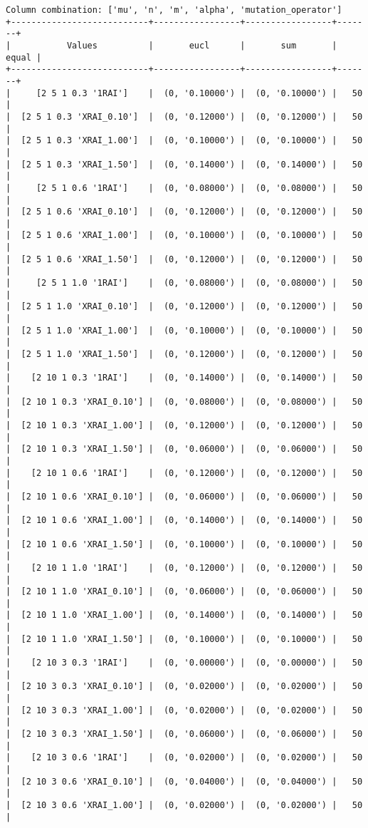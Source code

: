 \documentclass{article}
\begin{document}
\begin{verbatim}
Column combination: ['mu', 'n', 'm', 'alpha', 'mutation_operator']
+---------------------------+-----------------+-----------------+-------+
|           Values          |       eucl      |       sum       | equal |
+---------------------------+-----------------+-----------------+-------+
|     [2 5 1 0.3 '1RAI']    |  (0, '0.10000') |  (0, '0.10000') |   50  |
|  [2 5 1 0.3 'XRAI_0.10']  |  (0, '0.12000') |  (0, '0.12000') |   50  |
|  [2 5 1 0.3 'XRAI_1.00']  |  (0, '0.10000') |  (0, '0.10000') |   50  |
|  [2 5 1 0.3 'XRAI_1.50']  |  (0, '0.14000') |  (0, '0.14000') |   50  |
|     [2 5 1 0.6 '1RAI']    |  (0, '0.08000') |  (0, '0.08000') |   50  |
|  [2 5 1 0.6 'XRAI_0.10']  |  (0, '0.12000') |  (0, '0.12000') |   50  |
|  [2 5 1 0.6 'XRAI_1.00']  |  (0, '0.10000') |  (0, '0.10000') |   50  |
|  [2 5 1 0.6 'XRAI_1.50']  |  (0, '0.12000') |  (0, '0.12000') |   50  |
|     [2 5 1 1.0 '1RAI']    |  (0, '0.08000') |  (0, '0.08000') |   50  |
|  [2 5 1 1.0 'XRAI_0.10']  |  (0, '0.12000') |  (0, '0.12000') |   50  |
|  [2 5 1 1.0 'XRAI_1.00']  |  (0, '0.10000') |  (0, '0.10000') |   50  |
|  [2 5 1 1.0 'XRAI_1.50']  |  (0, '0.12000') |  (0, '0.12000') |   50  |
|    [2 10 1 0.3 '1RAI']    |  (0, '0.14000') |  (0, '0.14000') |   50  |
|  [2 10 1 0.3 'XRAI_0.10'] |  (0, '0.08000') |  (0, '0.08000') |   50  |
|  [2 10 1 0.3 'XRAI_1.00'] |  (0, '0.12000') |  (0, '0.12000') |   50  |
|  [2 10 1 0.3 'XRAI_1.50'] |  (0, '0.06000') |  (0, '0.06000') |   50  |
|    [2 10 1 0.6 '1RAI']    |  (0, '0.12000') |  (0, '0.12000') |   50  |
|  [2 10 1 0.6 'XRAI_0.10'] |  (0, '0.06000') |  (0, '0.06000') |   50  |
|  [2 10 1 0.6 'XRAI_1.00'] |  (0, '0.14000') |  (0, '0.14000') |   50  |
|  [2 10 1 0.6 'XRAI_1.50'] |  (0, '0.10000') |  (0, '0.10000') |   50  |
|    [2 10 1 1.0 '1RAI']    |  (0, '0.12000') |  (0, '0.12000') |   50  |
|  [2 10 1 1.0 'XRAI_0.10'] |  (0, '0.06000') |  (0, '0.06000') |   50  |
|  [2 10 1 1.0 'XRAI_1.00'] |  (0, '0.14000') |  (0, '0.14000') |   50  |
|  [2 10 1 1.0 'XRAI_1.50'] |  (0, '0.10000') |  (0, '0.10000') |   50  |
|    [2 10 3 0.3 '1RAI']    |  (0, '0.00000') |  (0, '0.00000') |   50  |
|  [2 10 3 0.3 'XRAI_0.10'] |  (0, '0.02000') |  (0, '0.02000') |   50  |
|  [2 10 3 0.3 'XRAI_1.00'] |  (0, '0.02000') |  (0, '0.02000') |   50  |
|  [2 10 3 0.3 'XRAI_1.50'] |  (0, '0.06000') |  (0, '0.06000') |   50  |
|    [2 10 3 0.6 '1RAI']    |  (0, '0.02000') |  (0, '0.02000') |   50  |
|  [2 10 3 0.6 'XRAI_0.10'] |  (0, '0.04000') |  (0, '0.04000') |   50  |
|  [2 10 3 0.6 'XRAI_1.00'] |  (0, '0.02000') |  (0, '0.02000') |   50  |

\end{verbatim}
\end{document}
